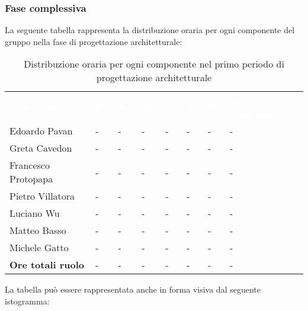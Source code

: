 \subsubsection{Fase complessiva}
La seguente tabella rappresenta la distribuzione oraria per ogni componente del gruppo nella fase di progettazione architetturale:
\begin{table}[!htbp]
\begin{center}
\renewcommand{\arraystretch}{1.25}
\begin{tabular}{ m{}<{\centering}  m{}<{\centering} m{}<{\centering} m{}<{\centering}  m{}<{\centering}  m{}<{\centering}  m{}<{\centering}  m{}<{\centering}   }
	\rowcolor{darkblue}
	\textcolor{white}{\textbf{Componente}} &\textcolor{white}{\textbf{Re}}&\textcolor{white}{\textbf{Ad}}&\textcolor{white}{\textbf{An}}&\textcolor{white}{\textbf{Pt}}&\textcolor{white}{\textbf{Pr}}&\textcolor{white}{\textbf{Ve}}&\textcolor{white}{\textbf{Ore complessive}}\\ 

	Edoardo Pavan & - & - & - & - & - & - & -\\	

	Greta Cavedon & - & - & - & - & - & - & -\\
	
	Francesco Protopapa & - & - & - & - & - & - & -\\
	
	Pietro Villatora & - & - & - & - & - & - & -\\
	
	Luciano Wu & - & - & - & - & - & - & -\\
	
	Matteo Basso & - & - & - & - & - & - & -\\
	
	Michele Gatto & - & - & - & - & - & - & -\\
	
	\textbf{Ore totali ruolo} & - & - & - & - & - & - & -\\

\end{tabular}
\caption{Distribuzione oraria per ogni componente nel primo periodo di progettazione architetturale}
\end{center}
\end{table}

La tabella può essere rappresentata anche in forma visiva dal seguente istogramma:

